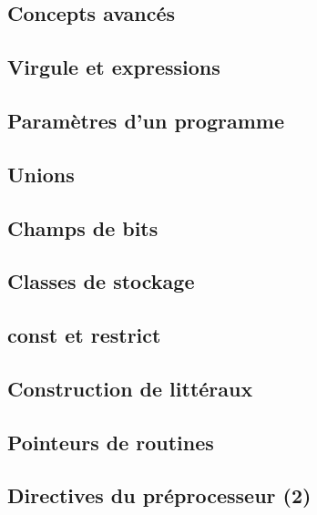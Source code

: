 \documentclass{minitelreport}
\begin{document}
\begin{refsection}
	\chapter{Concepts avancés}
	\label{chap:concepts_avances}
		\section{Virgule et expressions}
			\label{sec:virgule_et_expressions}
			
		\section{Paramètres d'un programme}
			\label{sec:parametres_programme}
			
		\section{Unions}
			\label{sec:unions}
			
		\section{Champs de bits}
			\label{sec:champs_de_bits}
			
		\section{Classes de stockage}
			\label{sec:classes_de_stockage}
			
		\section{const et restrict}
			\label{sec:const_et_restrict}
			
		\section{Construction de littéraux}
			\label{sec:construction_de_litt_raux}
			
		\section{Pointeurs de routines}
			\label{sec:pointeurs_de_routines}
			
		\section{Directives du préprocesseur (2)}
			\label{sec:directives_de_pr_processeurs_2_}
			

\end{refsection}
\end{document}
